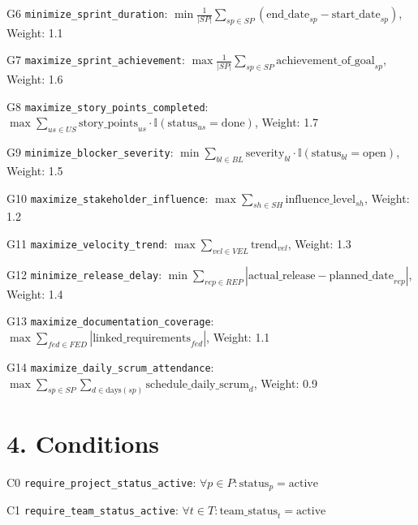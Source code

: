 \documentclass[12pt]{article}
\begin{document}
    \item[G6] \texttt{minimize\_sprint\_duration}: 
    $\min \frac{1}{|SP|} \sum_{sp \in SP} (\text{end\_date}_{sp} - \text{start\_date}_{sp})$, Weight: 1.1
    
    \item[G7] \texttt{maximize\_sprint\_achievement}: 
    $\max \frac{1}{|SP|} \sum_{sp \in SP} \text{achievement\_of\_goal}_{sp}$, Weight: 1.6
    
    \item[G8] \texttt{maximize\_story\_points\_completed}: 
    $\max \sum_{us \in US} \text{story\_points}_{us} \cdot \mathbb{I}(\text{status}_{us} = \text{done})$, Weight: 1.7
    
    \item[G9] \texttt{minimize\_blocker\_severity}: 
    $\min \sum_{bl \in BL} \text{severity}_{bl} \cdot \mathbb{I}(\text{status}_{bl} = \text{open})$, Weight: 1.5
    
    \item[G10] \texttt{maximize\_stakeholder\_influence}: 
    $\max \sum_{sh \in SH} \text{influence\_level}_{sh}$, Weight: 1.2
    
    \item[G11] \texttt{maximize\_velocity\_trend}: 
    $\max \sum_{vel \in VEL} \text{trend}_{vel}$, Weight: 1.3
    
    \item[G12] \texttt{minimize\_release\_delay}: 
    $\min \sum_{rep \in REP} |\text{actual\_release} - \text{planned\_date}_{rep}|$, Weight: 1.4
    
    \item[G13] \texttt{maximize\_documentation\_coverage}: 
    $\max \sum_{fed \in FED} |\text{linked\_requirements}_{fed}|$, Weight: 1.1
    
    \item[G14] \texttt{maximize\_daily\_scrum\_attendance}: 
    $\max \sum_{sp \in SP} \sum_{d \in \text{days}(sp)} \text{schedule\_daily\_scrum}_{d}$, Weight: 0.9

\section{4. Conditions}
\item[C0] \texttt{require\_project\_status\_active}: 
    $\forall p \in P: \text{status}_p = \text{active}$
    
    \item[C1] \texttt{require\_team\_status\_active}: 
    $\forall t \in T: \text{team\_status}_t = \text{active}$
    
\end{document}
